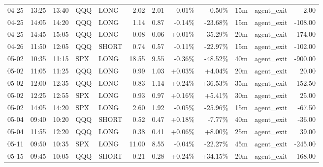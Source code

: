 \documentclass[11pt,a4paper]{article}
\begin{document}
\begin{center}
\begin{longtable}{>{\color{txtmain}}l l l l l r r r r r >{\color{txtmain}}l r}
04-25 & 13:25 & 13:40 & QQQ & LONG & 2.02 & 2.01 & \textcolor{lossred}{-0.01\%} & \textcolor{lossred}{-0.50\%} & 15m & agent\_exit & \textcolor{lossred}{-2.00} \\
04-25 & 14:05 & 14:20 & QQQ & LONG & 1.14 & 0.87 & \textcolor{lossred}{-0.14\%} & \textcolor{lossred}{-23.68\%} & 15m & agent\_exit & \textcolor{lossred}{-108.00} \\
04-25 & 14:45 & 15:05 & QQQ & LONG & 0.08 & 0.06 & \textcolor{wingreen}{+0.01\%} & \textcolor{lossred}{-35.29\%} & 20m & agent\_exit & \textcolor{lossred}{-174.00} \\
04-26 & 11:50 & 12:05 & QQQ & SHORT & 0.74 & 0.57 & \textcolor{lossred}{-0.11\%} & \textcolor{lossred}{-22.97\%} & 15m & agent\_exit & \textcolor{lossred}{-102.00} \\
05-02 & 10:35 & 11:15 & SPX & LONG & 18.55 & 9.55 & \textcolor{lossred}{-0.36\%} & \textcolor{lossred}{-48.52\%} & 40m & agent\_exit & \textcolor{lossred}{-900.00} \\
05-02 & 11:05 & 11:25 & QQQ & LONG & 0.99 & 1.03 & \textcolor{wingreen}{+0.03\%} & \textcolor{wingreen}{+4.04\%} & 20m & agent\_exit & \textcolor{wingreen}{20.00} \\
05-02 & 12:00 & 12:35 & QQQ & LONG & 0.83 & 1.14 & \textcolor{wingreen}{+0.24\%} & \textcolor{wingreen}{+36.53\%} & 35m & agent\_exit & \textcolor{wingreen}{152.50} \\
05-02 & 12:25 & 12:55 & SPX & LONG & 0.93 & 0.97 & \textcolor{wingreen}{+0.16\%} & \textcolor{wingreen}{+5.41\%} & 30m & agent\_exit & \textcolor{wingreen}{25.00} \\
05-02 & 14:05 & 14:20 & SPX & LONG & 2.60 & 1.92 & \textcolor{lossred}{-0.05\%} & \textcolor{lossred}{-25.96\%} & 15m & agent\_exit & \textcolor{lossred}{-67.50} \\
05-04 & 09:40 & 10:20 & QQQ & SHORT & 0.52 & 0.47 & \textcolor{wingreen}{+0.18\%} & \textcolor{lossred}{-7.77\%} & 40m & agent\_exit & \textcolor{lossred}{-36.00} \\
05-04 & 11:55 & 12:20 & QQQ & LONG & 0.38 & 0.41 & \textcolor{wingreen}{+0.06\%} & \textcolor{wingreen}{+8.00\%} & 25m & agent\_exit & \textcolor{wingreen}{39.00} \\
05-11 & 09:50 & 10:35 & SPX & LONG & 11.00 & 8.55 & \textcolor{lossred}{-0.04\%} & \textcolor{lossred}{-22.27\%} & 45m & agent\_exit & \textcolor{lossred}{-245.00} \\
05-15 & 09:45 & 10:05 & QQQ & SHORT & 0.21 & 0.28 & \textcolor{wingreen}{+0.24\%} & \textcolor{wingreen}{+34.15\%} & 20m & agent\_exit & \textcolor{wingreen}{168.00} \\

\end{longtable}
\end{center}
\end{document}
